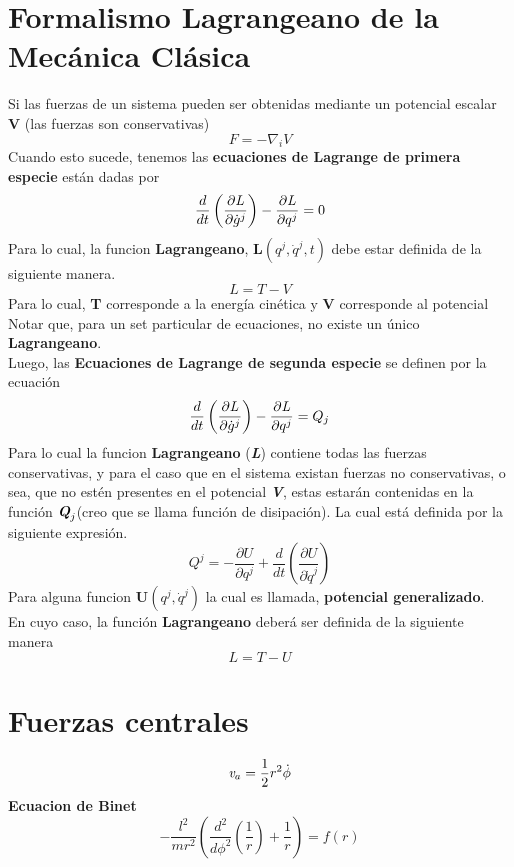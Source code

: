 \documentclass[../main.tex]{subfiles}
\begin{document}
\section{Formalismo Lagrangeano de la Mecánica Clásica}
Si las fuerzas de un sistema pueden ser obtenidas mediante un potencial escalar \textbf{V} (las fuerzas son conservativas)
\begin{equation}
    F=-\nabla_iV
\end{equation}
Cuando esto sucede, tenemos las \textbf{ecuaciones de Lagrange de primera especie} están dadas por
\begin{equation}
    \frac{d}{dt}\left( \frac{\partial \emph{L}}{\partial \dot{g}^j} \right) - \frac{\partial \emph{L}}{\partial q^j}=0
\end{equation}
Para lo cual, la funcion \textbf{Lagrangeano}, $\textbf{L}(q^j,\dot{q}^j,t)$ debe estar definida de la siguiente manera.
\begin{equation}
    L=T-V
\end{equation}
Para lo cual, \textbf{T} corresponde a la energía cinética y \textbf{V} corresponde al potencial  
Notar que, para un set particular de ecuaciones, no existe un único \textbf{Lagrangeano}. \\
Luego, las \textbf{Ecuaciones de Lagrange de segunda especie} se definen por la ecuación
\begin{equation}
    \frac{d}{dt}\left( \frac{\partial \emph{L}}{\partial \dot{g}^j} \right) - \frac{\partial \emph{L}}{\partial q^j}=Q_j
\end{equation}
Para lo cual la funcion \textbf{Lagrangeano} (\emph{\textbf{L}}) contiene todas las fuerzas conservativas, y para el caso que en el sistema existan fuerzas no conservativas, o sea, que no estén presentes en el potencial \emph{\textbf{V}}, estas estarán contenidas en la función $\emph{\textbf{Q}}_j$(creo que se llama función de disipación). La cual está definida por la siguiente expresión.
\begin{equation}
    Q^j=-\frac{\partial U}{\partial q^j}+\frac{d}{dt}\left( \frac{\partial U }{\partial \dot{q}^j}\right)
\end{equation}
Para alguna funcion $\textbf{U}(q^j,\dot{q}^j)$ la  cual es llamada, \textbf{potencial generalizado}. \\
En cuyo caso, la función \textbf{Lagrangeano} deberá ser definida de la siguiente manera
\begin{equation}
    L=T-U
\end{equation}
\section{Fuerzas centrales}
\begin{equation}
    \emph{v}_a=\frac{1}{2}r^2\dot{\phi}
\end{equation}
\textbf{Ecuacion de Binet}
\begin{equation} \label{eq:binet}
    -\frac{l^2}{mr^2} \left( \frac{d^2}{d \phi^2}\left( \frac{1}{r}\right)+\frac{1}{r} \right)=f(r)
\end{equation}
\end{document}
